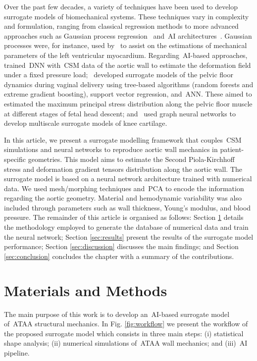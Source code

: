 \documentclass[a4paper,fleqn]{cas-sc}
\begin{document}
Over the past few decades, a variety of techniques have been used to develop surrogate models of biomechanical systems. These techniques vary in complexity and formulation, ranging from classical regression methods to more advanced approaches such as Gaussian process regression~\cite{Su2017_ji,Saida2023_vm} and~\gls{AI} architectures~\cite{Hashemi2023,Moura2024_vy}. Gaussian processes were, for instance, used by~\citet{Di_Achille2018_pn} to assist on the estimations of mechanical parameters of the left ventricular myocardium. Regarding~\gls{AI}-based approaches,~\citet{Liang2023_on} trained~\gls{DNN} with~\gls{CSM} data of the aortic wall to estimate the deformation field under a fixed pressure load;~\citet{Moura2024_rh} developed surrogate models of the pelvic floor dynamics during vaginal delivery using tree-based algorithms (random forests and extreme gradient boosting), support vector regression, and~\gls{ANN}. These aimed to estimated the maximum principal stress distribution along the pelvic floor muscle at different stages of fetal head descent; and~\citet{Sajjadinia2024_dv} used graph neural networks to develop multiscale surrogate models of knee cartilage.

In this article, we present a surrogate modelling framework that couples~\gls{CSM} simulations and neural networks to reproduce aortic wall mechanics in patient-specific geometries. This model aims to estimate the Second Piola-Kirchhoff stress and deformation gradient tensors distribution along the aortic wall. The surrogate model is based on a neural network architecture trained with numerical data. We used mesh/morphing techniques and~\gls{PCA} to encode the information regarding the aortic geometry. Material and hemodynamic variability was also included through parameters such as wall thickness, Young's modulus, and blood pressure. The remainder of this article is organised as follows: Section \ref{sec:methods} details the methodology employed to generate the database of numerical data and train the neural network; Section \ref{sec:results} present the results of the surrogate model performance; Section \ref{sec:discussion} discusses the main findings; and Section \ref{sec:conclusion} concludes the chapter with a summary of the contributions.
  
\section{Materials and Methods} \label{sec:methods}
The main purpose of this work is to develop an~\gls{AI}-based surrogate model of~\gls{ATAA} structural mechanics. In Fig. \ref{fig:workflow} we present the workflow of the proposed surrogate model which consists in three main steps: (i) statistical shape analysis; (ii) numerical simulations of~\gls{ATAA} wall mechanics; and (iii)~\gls{AI} pipeline.
\end{document}
